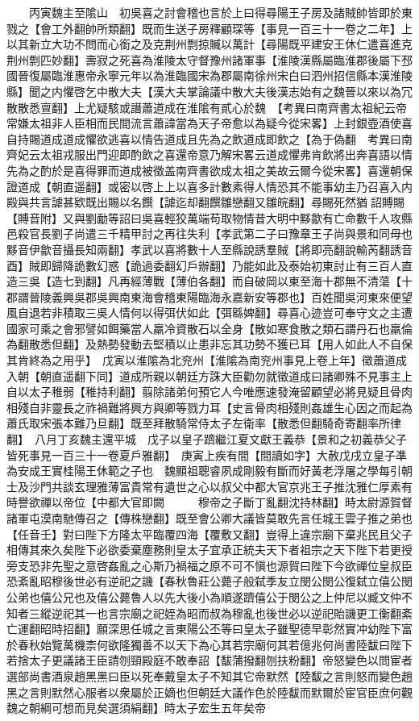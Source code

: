 　　丙寅魏主至隂山　初吳喜之討會稽也言於上曰得尋陽王子房及諸賊帥皆即於東戮之【會工外翻帥所類翻】既而生送子房釋顧琛等【事見一百三十一卷之二年】上以其新立大功不問而心銜之及克荆州剽掠贓以萬計【尋陽既平建安王休仁遣喜進克荆州剽匹妙翻】壽寂之死喜為淮陵太守督豫州諸軍事【淮陵漢縣屬臨淮郡後屬下邳國晉復屬臨淮惠帝永寧元年以為淮臨國宋為郡屬南徐州宋白曰泗州招信縣本漢淮陵縣】聞之内懼啓乞中散大夫【漢大夫掌論議中散大夫後漢志始有之魏晉以來以為冗散散悉亶翻】上尤疑駭或譖蕭道成在淮隂有貳心於魏　【考異曰南齊書太祖紀云帝常嫌太祖非人臣相而民間流言蕭諱當為天子帝愈以為疑今從宋畧】上封銀壺酒使喜自持賜道成道成懼欲逃喜以情告道成且先為之飲道成即飲之【為于偽翻　考異曰南齊妃云太祖戎服出門迎即酌飲之喜還帝意乃解宋畧云道成懼弗肯飲將出奔喜語以情先為之酌於是喜得罪而道成被徵盖南齊書欲成太祖之美故云爾今從宋畧】喜還朝保證道成【朝直遥翻】或密以啓上上以喜多計數素得人情恐其不能事幼主乃召喜入内殿與共言謔甚欵既出賜以名饌【謔迄却翻饌雛戀翻又雛皖翻】尋賜死然猶詔賻賜【賻音附】又與劉勔等詔曰吳喜輕狡萬端苟取物情昔大明中黟歙有亡命數千人攻縣邑殺官長劉子尚遣三千精甲討之再往失利【孝武第二子曰豫章王子尚與景和同母也黟音伊歙音攝長知兩翻】孝武以喜將數十人至縣說誘羣賊【將即亮翻說輸芮翻誘音酉】賊即歸降詭數幻惑【詭過委翻幻戶辦翻】乃能如此及泰始初東討止有三百人直造三吳【造七到翻】凡再經薄戰【薄伯各翻】而自破岡以東至海十郡無不清蕩【十郡謂晉陵義興吳郡吳興南東海會稽東陽臨海永嘉新安等郡也】百姓聞吳河東來便望風自退若非積取三吳人情何以得弭伏如此【弭緜婢翻】尋喜心迹豈可奉守文之主遭國家可乘之會邪譬如餌藥當人羸冷資散石以全身【散如寒食散之類石謂丹石也羸倫為翻散悉但翻】及熱勢發動去堅積以止患非忘其功勢不獲已耳【用人如此人不自保其肯終為之用乎】　戊寅以淮隂為北兖州【淮隂為南兖州事見上卷上年】徵蕭道成入朝【朝直遥翻下同】道成所親以朝廷方誅大臣勸勿就徵道成曰諸卿殊不見事主上自以太子稚弱【稚持利翻】翦除諸弟何預它人今唯應速發淹留顧望必將見疑且骨肉相殘自非靈長之祚禍難將興方與卿等戮力耳【史言骨肉相殘則姦雄生心因之而起為蕭氏取宋張本難乃旦翻】既至拜散騎常侍太子左衛率【散悉但翻騎奇寄翻率所律翻】　八月丁亥魏主還平城　戊子以皇子躋繼江夏文獻王義恭【景和之初義恭父子皆死事見一百三十一卷夏戶雅翻】　庚寅上疾有間【間讀如字】大赦戊戌立皇子凖為安成王實桂陽王休範之子也　魏顯祖聰睿夙成剛毅有斷而好黃老浮屠之學每引朝士及沙門共談玄理雅薄富貴常有遺世之心以叔父中都大官京兆王子推沈雅仁厚素有時譽欲禪以帝位【中都大官即闕　　　穆帝之子斷丁亂翻沈持林翻】時太尉源賀督諸軍屯漠南馳傳召之【傳株戀翻】既至會公卿大議皆莫敢先言任城王雲子推之弟也【任音壬】對曰陛下方隆太平臨覆四海【覆敷又翻】豈得上違宗廟下棄兆民且父子相傳其來久矣陛下必欲委棄塵務則皇太子宜承正統夫天下者祖宗之天下陛下若更授旁支恐非先聖之意啓姦亂之心斯乃禍福之原不可不愼也源賀曰陛下今欲禪位皇叔臣恐紊亂昭穆後世必有逆祀之譏【春秋魯莊公薨子般弑季友立閔公閔公復弑立僖公閔公弟也僖公兄也及僖公薨魯人以先大後小為順遂躋僖公于閔公之上仲尼以臧文仲不知者三縱逆祀其一也言宗廟之祀姪為昭而叔為穆亂也後世必以逆祀貽譏更工衡翻紊亡運翻昭時招翻】願深思任城之言東陽公丕等曰皇太子雖聖德早彰然實冲幼陛下富於春秋始覽萬機柰何欲隆獨善不以天下為心其若宗廟何其若億兆何尚書陸馛曰陛下若捨太子更議諸王臣請刎頸殿庭不敢奉詔【馛蒲撥翻刎扶粉翻】帝怒變色以問宦者選部尚書酒泉趙黑黑曰臣以死奉戴皇太子不知其它帝默然【陸馛之言則怒而變色趙黑之言則默然心服者以衆屬於正嫡也但朝廷大議作色於陸馛而默爾於宦官臣庶何觀魏之朝綱可想而見矣選須絹翻】時太子宏生五年矣帝